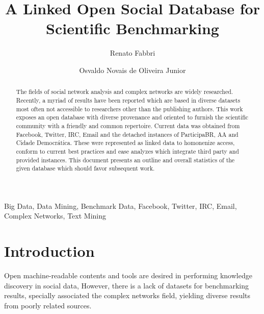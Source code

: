 \documentclass[review]{elsarticle}
\begin{document}
%
\begin{frontmatter}
%
\title{A Linked Open Social Database for Scientific Benchmarking}
%
\author[pwr]{Renato Fabbri}
%
\author[pwr]{Osvaldo Novais de Oliveira Junior}
%
\address[pwr]{S\~ao Carlos Institute of Physics, S\~ao Paulo
University, Brazil}
%
%
\begin{abstract}
The fields of social network analysis and complex networks
are widely researched.
Recently, a myriad of results have been reported which are based in
diverse datasets most often not accessible to researchers other than the publishing authors.
This work exposes an open database with diverse provenance and oriented
to furnish the scientific community with a friendly and common repertoire.
Current data was obtained from Facebook, Twitter, IRC, Email and the
detached instances of ParticipaBR, AA and Cidade Democr\'atica.
These were represented as linked data to homonenize access,
conform to current best practices and ease analyzes which integrate third
party and provided instances.
This document presents an outline and overall statistics of the given
database which should favor subsequent work.
\end{abstract}
%
\begin{keyword}
Big Data, Data Mining, Benchmark Data, Facebook, Twitter, IRC, Email,
Complex Networks, Text Mining
\end{keyword}

\end{frontmatter}

\section{Introduction}


Open machine-readable contents and tools are desired
in performing knowledge discovery in social data,
However, there is a lack of datasets for benchmarking results,
specially associated the complex networks field,
yielding diverse results from poorly related sources.
\end{document}
